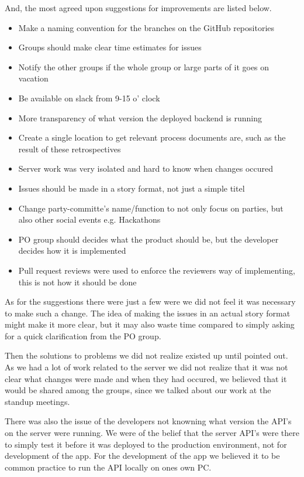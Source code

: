 And, the most agreed upon suggestions for improvements are listed below.
\begin{itemize}
  \item Make a naming convention for the branches on the GitHub repositories
  \item Groups should make clear time estimates for issues
  \item Notify the other groups if the whole group or large parts of it goes on vacation
  \item Be available on slack from 9-15 o' clock
  \item More transparency of what version the deployed backend is running
  \item Create a single location to get relevant process documents are, such as the result of these retrospectives
  \item Server work was very isolated and hard to know when changes occured
  \item Issues should be made in a story format, not just a simple titel
  \item Change party-committe's name/function to not only focus on parties, but also other social events e.g. Hackathons
  \item PO group should decides what the product should be, but the developer decides how it is implemented
  \item Pull request reviews were used to enforce the reviewers way of implementing, this is not how it should be done
\end{itemize}

As for the suggestions there were just a few were we did not feel it was necessary to make such a change.
The idea of making the issues in an actual story format might make it more clear, but it may also waste time compared to simply asking for a quick clarification from the PO group. 

Then the solutions to problems we did not realize existed up until pointed out.
As we had a lot of work related to the server we did not realize that it was not clear what changes were made and when they had occured, we believed that it would be shared among the groups, since we talked about our work at the standup meetings. 

There was also the issue of the developers not knowning what version the API's on the server were running.
We were of the belief that the server API's were there to simply test it before it was deployed to the production environment, not for development of the app.
For the development of the app we believed it to be common practice to run the API locally on ones own PC.

